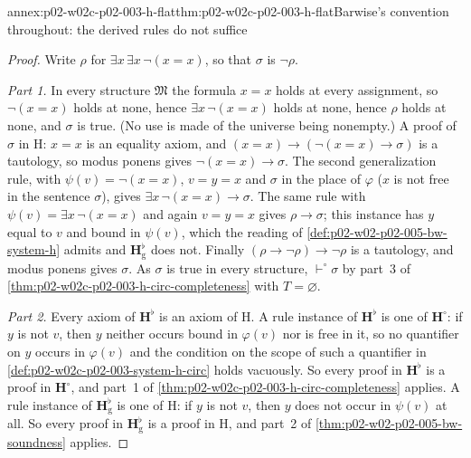 \begin{annexitem}{annex:p02-w02c-p02-003-h-flat}{thm:p02-w02c-p02-003-h-flat}{Barwise's convention throughout: the derived rules do not suffice}
\begin{proof}
Write \(\rho\) for \(\exists x\,\exists x\,\neg(x=x)\), so that \(\sigma\)
is \(\neg\rho\).

\emph{Part 1.}  In every structure \(\mathfrak M\) the formula \(x=x\) holds
at every assignment, so \(\neg(x=x)\) holds at none, hence
\(\exists x\,\neg(x=x)\) holds at none, hence \(\rho\) holds at none, and
\(\sigma\) is true.  (No use is made of the universe being nonempty.)  A
proof of \(\sigma\) in H: \(x=x\) is an equality axiom, and
\((x=x)\to(\neg(x=x)\to\sigma)\) is a tautology, so modus ponens gives
\(\neg(x=x)\to\sigma\).  The second generalization rule, with
\(\psi(v)=\neg(x=x)\), \(v=y=x\) and \(\sigma\) in the place of
\(\varphi\) (\(x\) is not free in the sentence \(\sigma\)), gives
\(\exists x\,\neg(x=x)\to\sigma\).  The same rule with
\(\psi(v)=\exists x\,\neg(x=x)\) and again \(v=y=x\) gives
\(\rho\to\sigma\); this instance has \(y\) equal to \(v\) and bound in
\(\psi(v)\), which the reading of \cref{def:p02-w02-p02-005-bw-system-h}
admits and \(\mathbf H^{\flat}_{\mathrm g}\) does not.  Finally
\((\rho\to\neg\rho)\to\neg\rho\) is a tautology, and modus ponens gives
\(\sigma\).  As \(\sigma\) is true in every structure,
\(\vdash^{\circ}\sigma\) by part~3 of
\cref{thm:p02-w02c-p02-003-h-circ-completeness} with \(T=\varnothing\).

\emph{Part 2.}  Every axiom of \(\mathbf H^{\flat}\) is an axiom of H.  A
rule instance of \(\mathbf H^{\flat}\) is one of
\(\mathbf H^{\circ}\): if \(y\) is not \(v\), then \(y\) neither occurs
bound in \(\varphi(v)\) nor is free in it, so no quantifier on \(y\)
occurs in \(\varphi(v)\) and the condition on the scope of such a
quantifier in \cref{def:p02-w02c-p02-003-system-h-circ} holds vacuously.
So every proof in \(\mathbf H^{\flat}\) is a proof in \(\mathbf H^{\circ}\),
and part~1 of \cref{thm:p02-w02c-p02-003-h-circ-completeness} applies.  A
rule instance of \(\mathbf H^{\flat}_{\mathrm g}\) is one of H: if \(y\) is
not \(v\), then \(y\) does not occur in \(\psi(v)\) at all.  So every proof
in \(\mathbf H^{\flat}_{\mathrm g}\) is a proof in H, and part~2 of
\cref{thm:p02-w02-p02-005-bw-soundness} applies.


\end{proof}
\end{annexitem}
